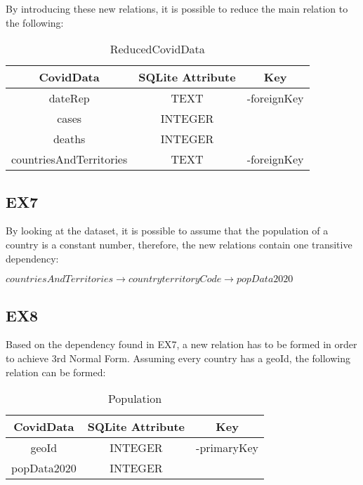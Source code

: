 \documentclass{article}
\begin{document}
By introducing these new relations, it is possible to reduce the main relation to the following:

\begin{table}[ht]
    \caption{ReducedCovidData}
    \vspace{5pt}
    \centering
    \begin{tabular}{c c c}
    \hline\hline
      CovidData  & SQLite Attribute & Key\\ [0.5ex]
    \hline
      dateRep  & TEXT & -foreignKey\\
      cases  & INTEGER \\
      deaths  & INTEGER \\
      countriesAndTerritories  & TEXT & -foreignKey\\ [0.5ex]
    \hline
    \end{tabular}
    \label{tab:Reduced}
\end{table}

\newpage

\subsection{EX7}

By looking at the dataset, it is possible to assume that the population of a country is a constant number, therefore, the new relations contain one transitive dependency:

\begin{center}
    $countriesAndTerritories \rightarrow countryterritoryCode \rightarrow popData2020$
\end{center}

\subsection{EX8}

Based on the dependency found in EX7, a new relation has to be formed in order to achieve 3rd Normal Form. Assuming every country has a geoId, the following relation can be formed:

\begin{table}[ht]
    \caption{Population}
    \vspace{5pt}
    \centering
    \begin{tabular}{c c c}
    \hline\hline
      CovidData  & SQLite Attribute & Key\\ [0.5ex]
    \hline
      geoId  & INTEGER & -primaryKey\\
      popData2020  & INTEGER \\ [0.5ex]
    \hline
    \end{tabular}
    \label{tab:Population}
\end{table}
\end{document}
